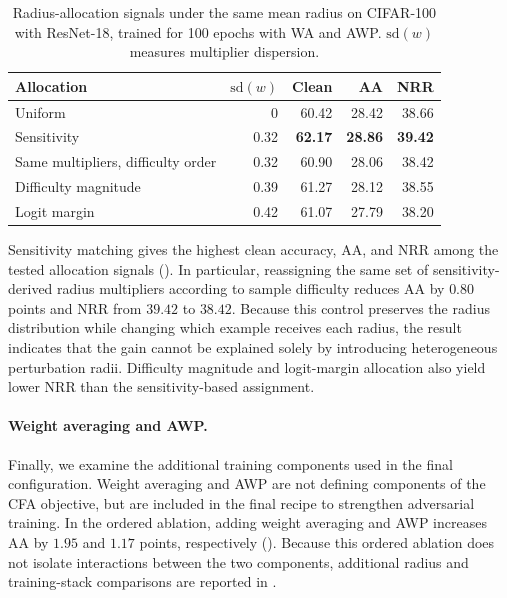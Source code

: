\begin{table}[!htbp]
  \centering
  \small
  \setlength{\tabcolsep}{4.5pt}
  \caption{
  Radius-allocation signals under the same mean radius on CIFAR-100 with
  ResNet-18, trained for 100 epochs with WA and AWP.
  \(\mathrm{sd}(w)\) measures multiplier dispersion.
  }
  \label{tab:allocation}
  \begin{tabular}{lrrrr}
    \toprule
    Allocation & \(\mathrm{sd}(w)\) & Clean & AA & NRR \\
    \midrule
    Uniform
      & 0 & 60.42 & 28.42 & 38.66 \\
    Sensitivity
      & 0.32 & \textbf{62.17} & \textbf{28.86} & \textbf{39.42} \\
    Same multipliers, difficulty order
      & 0.32 & 60.90 & 28.06 & 38.42 \\
    Difficulty magnitude
      & 0.39 & 61.27 & 28.12 & 38.55 \\
    Logit margin
      & 0.42 & 61.07 & 27.79 & 38.20 \\
    \bottomrule
  \end{tabular}
\end{table}

Sensitivity matching gives the highest clean accuracy, AA, and NRR among the
tested allocation signals ().
In particular, reassigning the same set of sensitivity-derived radius
multipliers according to sample difficulty reduces AA by \(0.80\) points and
NRR from \(39.42\) to \(38.42\).
Because this control preserves the radius distribution while changing which
example receives each radius, the result indicates that the gain cannot be
explained solely by introducing heterogeneous perturbation radii.
Difficulty magnitude and logit-margin allocation also yield lower NRR than
the sensitivity-based assignment.


\paragraph{Weight averaging and AWP.}

Finally, we examine the additional training components used in the final
configuration.
Weight averaging and AWP are not defining components of the CFA objective,
but are included in the final recipe to strengthen adversarial training.
In the ordered ablation, adding weight averaging and AWP increases AA by
\(1.95\) and \(1.17\) points, respectively
().
Because this ordered ablation does not isolate interactions between the two
components, additional radius and training-stack comparisons are reported in
.

